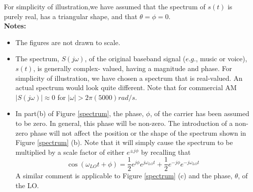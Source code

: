 \documentclass{article}
\begin{document}
For simplicity of illustration,we have assumed that the spectrum of $s(t)$ is purely real, has a triangular shape, and that $\theta = \phi = 0$.\\
\textbf{Notes:}
\begin{itemize}
\item The figures are not drawn to scale.
\item The spectrum, $S(j\omega)$, of the original baseband signal ($e.g.$, music or voice), $s(t)$, is generally complex- valued, having a magnitude and phase. For simplicity of illustration, we have chosen a spectrum that is real-valued. An actual spectrum would look quite different. Note that for commercial AM $|S(j\omega)|\approx 0$ for $|\omega|>2\pi(5000)rad/s$.
\item In part(b) of Figure \ref{spectrum}, the phase, $\phi$, of the carrier has been assumed to be zero. In general, this phase will be non-zero. The introduction of a non-zero phase will not affect the position or the shape of the spectrum shown in Figure \ref{spectrum} (b). Note that it will simply cause the spectrum to be multiplied by a scale factor of either $e^{\pm j\phi}$ by recalling that
$$\cos(\omega_{LO}t+\phi) = \frac{1}{2}e^{j\phi}e^{j\omega_{LO}t}+\frac{1}{2}e^{-j\phi}e^{-j\omega_{LO}t}$$
A similar comment is applicable to Figure \ref{spectrum} (c) and the phase, $\theta$, of the LO.
\end{itemize}
\end{document}
